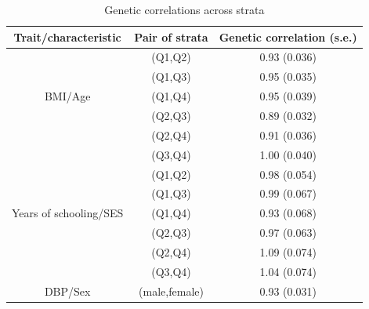 \documentclass[hidelinks, 12pt]{article}
\begin{document}
\begin{table}[h!]
\caption{Genetic correlations across strata}
\begin{center}
 \begin{tabular}{|c | c | c |} 
 \hline
 \textbf{Trait/characteristic} & \textbf{Pair of strata} & \textbf{Genetic correlation (s.e.)} \\ [0.5ex] 
 \hline\hline
   & (Q1,Q2) & 0.93 (0.036)  \\ 
   & (Q1,Q3) & 0.95 (0.035)  \\ 
 BMI/Age & (Q1,Q4) & 0.95 (0.039)  \\ 
   & (Q2,Q3) & 0.89 (0.032)  \\ 
   & (Q2,Q4) & 0.91 (0.036)  \\ 
   & (Q3,Q4) & 1.00 (0.040)  \\ 
 \hline\hline
  & (Q1,Q2) & 0.98 (0.054)  \\ 
  & (Q1,Q3) & 0.99 (0.067)  \\ 
 Years of schooling/SES & (Q1,Q4) & 0.93 (0.068)  \\ 
  & (Q2,Q3) & 0.97 (0.063)  \\ 
  & (Q2,Q4) & 1.09 (0.074)  \\ 
  & (Q3,Q4) & 1.04 (0.074)  \\ 
 \hline\hline
 DBP/Sex & (male,female) & 0.93 (0.031)  \\ 
 \hline
 \end{tabular}
 \end{center}
\end{table}
\end{document}
